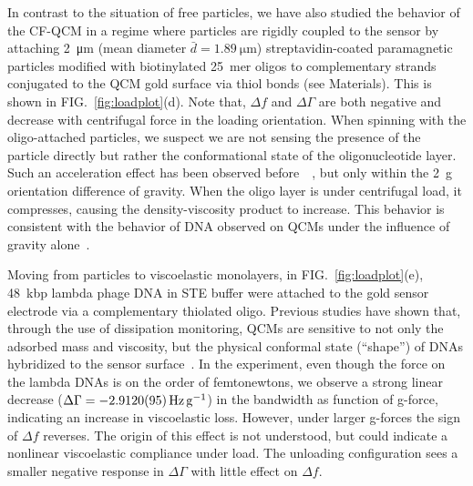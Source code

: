 \documentclass[floatfix,superscriptaddress,a4paper,twocolumn]{revtex4-1}
\newcommand{\Figure}[1]{FIG.~\ref{#1}}
\newcommand{\df}{\Delta\!f}
\newcommand{\dg}{\Delta\Gamma}
\begin{document}
In contrast to the situation of free particles, we have also studied the
behavior of the CF-QCM in a regime where particles are rigidly coupled to
the sensor by attaching \SI{2}{\micro\meter} (mean diameter
$\bar{d}=\SI{1.89}{\micro\meter}$) streptavidin-coated paramagnetic
particles modified with biotinylated \SI{25}{mer} oligos to complementary
strands conjugated to the QCM gold surface via thiol bonds (see
Materials).  This is shown in \Figure{fig:loadplot}(d).  Note
that, $\df$ and $\dg$ are both negative and decrease
with centrifugal force in the loading orientation.
When spinning with the oligo-attached
particles, we suspect we are not sensing the presence of the particle
directly but rather the conformational state of the oligonucleotide layer.
Such an acceleration effect has been observed
before~\cite{yoshimoto2002effect}~\cite{fawcett2004evidence}, but only
within the \SI{2}{g} orientation difference of gravity.  When the oligo
layer is under centrifugal load, it compresses, causing the
density-viscosity product to increase.  This behavior is consistent with
the behavior of DNA observed on QCMs under the influence of gravity
alone~\cite{fawcett2004evidence}.

Moving from particles to viscoelastic monolayers, in
\Figure{fig:loadplot}(e), \SI{48}{kbp} lambda phage DNA in STE buffer were
attached to the gold sensor electrode via a complementary thiolated oligo.  Previous studies have shown that,
through the use of dissipation monitoring, QCMs are sensitive to not only
the adsorbed mass and viscosity, but the physical conformal state
(``shape'') of DNAs hybridized to the sensor
surface~\cite{tsortos2008shear}.  In the experiment, even though the force
on the lambda DNAs is on the order of femtonewtons, we observe a strong
linear decrease ($\dg=\SI{-2.912+-0.0095}{\hertz\per\g}$) in the
bandwidth as function of g-force, indicating an
increase in viscoelastic loss.  However, under larger g-forces the sign of
$\df$ reverses.  The origin of this effect is not understood, but
could indicate a nonlinear viscoelastic compliance under load.  The
unloading configuration sees a smaller negative response in $\dg$ with little
effect on $\df$.
\end{document}
